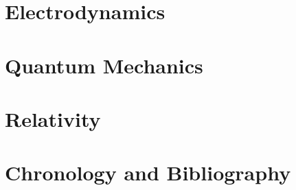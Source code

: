 \part{Electrodynamics}
   
   
   

\part{Quantum Mechanics}
   
   
   
   
   
   
   
   
   
   
   

\part{Relativity}
   
   
   
   
   
   
   
   
   

\part{Chronology and Bibliography}
   
